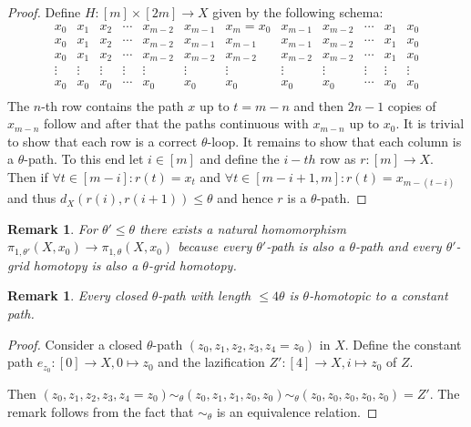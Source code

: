 \documentclass[a4paper, 11pt, twoside]{article}
\theoremstyle{break}
\theoremstyle{break}
\newtheorem{rem}[thm]{Remark}
\begin{document}
\begin{proof}
  Define $H: [m] \times [2m] \to X$ given by the following schema:
  \begin{equation*}
    \begin{matrix}
      x_0 & x_1 & x_2 & \cdots & x_{m-2} & x_{m-1} & x_m = x_0 & x_{m-1} & x_{m-2} & \cdots & x_1 & x_0 \\
      x_0 & x_1 & x_2 & \cdots & x_{m-2} & x_{m-1} & x_{m-1} & x_{m-1} & x_{m-2} & \cdots & x_1 & x_0 \\
      x_0 & x_1 & x_2 & \cdots & x_{m-2} & x_{m-2} & x_{m-2} & x_{m-2} & x_{m-2} & \cdots & x_1 & x_0 \\
      \vdots & \vdots & \vdots & \vdots & \vdots & \vdots & \vdots & \vdots & \vdots & \vdots & \vdots & \vdots \\
      x_0 & x_0 & x_0 & \cdots & x_0 & x_0 & x_0 & x_0 & x_0 & \cdots & x_0 & x_0 \\
    \end{matrix}
  \end{equation*}
  The $n$-th row contains the path $x$ up to $t = m-n$ and then $2n-1$ copies of $x_{m-n}$ follow and after that the paths continuous with $x_{m-n}$ up to $x_0$.
  It is trivial to show that each row is a correct $\theta$-loop. It remains to show that each column is a $\theta$-path. To this end let $i \in [m]$ and define the $i-th$ row as $r: [m] \to X$.
  Then if $\forall t \in [m-i]: r(t) = x_t$ and $\forall t \in [m-i+1, m]: r(t) = x_{m-(t-i)}$ and thus $d_X(r(i), r(i+1)) \leq \theta$ and hence $r$ is a $\theta$-path.
\end{proof}

\begin{rem}
  For $\theta' \leq \theta$ there exists a natural homomorphism $\pi_{1,\theta'}(X, x_0) \to \pi_{1,\theta}(X, x_0)$ 
  because every $\theta'$-path is also a $\theta$-path and every $\theta'$-grid homotopy is also a $\theta$-grid homotopy.
\end{rem}

\begin{rem}
  Every closed $\theta$-path with length $\leq 4\theta$ is $\theta$-homotopic to a constant path.
\end{rem}

\begin{proof}
  Consider a closed $\theta$-path $(z_0, z_1, z_2, z_3, z_4 = z_0)$ in $X$. 
  Define the constant path $e_{z_0}: [0] \to X, 0 \mapsto z_0$ and the lazification $Z': [4] \to X, i \mapsto z_0$ of $Z$.

  Then $(z_0, z_1, z_2, z_3, z_4 = z_0) \sim_{\theta} (z_0, z_1, z_1, z_0, z_0)\sim_{\theta} (z_0, z_0, z_0, z_0, z_0) = Z'$. The remark follows from the fact that $\sim_{\theta}$ is an equivalence relation.
\end{proof}
\end{document}
